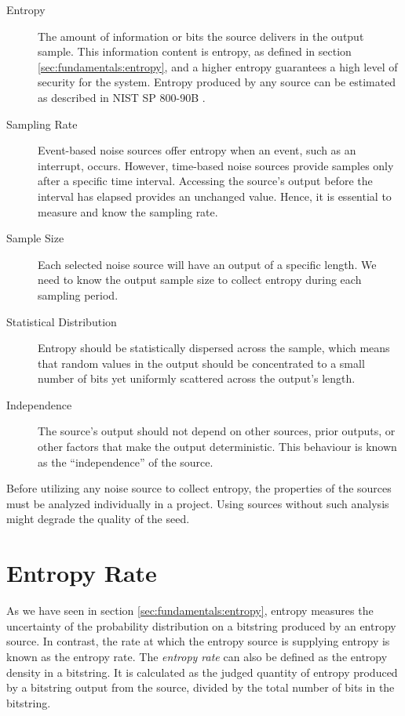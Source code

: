 \begin{description}
	\item[Entropy] The amount of information or bits the source delivers in the output sample. This information content is entropy, as defined in section \ref{sec:fundamentals:entropy}, and a higher entropy guarantees a high level of security for the system. Entropy produced by any source can be estimated as described in NIST SP 800-90B \cite{SP90B-2018}.
	
	\item[Sampling Rate] Event-based noise sources offer entropy when an event, such as an interrupt, occurs. However, time-based noise sources provide samples only after a specific time interval. Accessing the source’s output before the interval has elapsed provides an unchanged value. Hence, it is essential to measure and know the sampling rate.
	
	\item[Sample Size] Each selected noise source will have an output of a specific length. We need to know the output sample size to collect entropy during each sampling period.
	
	\item[Statistical Distribution] Entropy should be statistically dispersed across the sample, which means that random values in the output should be concentrated to a small number of bits yet uniformly scattered across the output’s length.
	
	\item[Independence] The source’s output should not depend on other sources, prior outputs, or other factors that make the output deterministic. This behaviour is known as the “independence” of the source.
\end{description}

Before utilizing any noise source to collect entropy, the properties of the sources must be analyzed individually in a project. Using sources without such analysis might degrade the quality of the seed.

%
%
\section{Entropy Rate}
\label{sec:fundamentals:entropyrate}

As we have seen in section \ref{sec:fundamentals:entropy}, entropy measures the uncertainty of the probability distribution on a bitstring produced by an entropy source. In contrast, the rate at which the entropy source is supplying entropy is known as the entropy rate. The \textit{entropy rate} can also be defined as the entropy density in a bitstring. It is calculated as the judged quantity of entropy produced by a bitstring output from the source, divided by the total number of bits in the bitstring.

